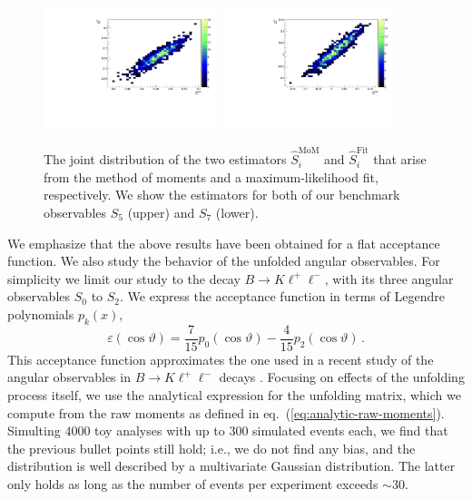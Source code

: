\documentclass[aps,nofootinbib,preprintnumbers,prd,twocolumn]{revtex4-1}
\newcommand{\est}[1]{\widehat{#1}}
\newcommand{\refeq}[1]{eq.~(\ref{eq:#1})}
\renewcommand{\theta}{\vartheta}
\let\eps\varepsilon
\begin{document}
\begin{figure}[t]
        \centering
            \includegraphics[width=0.45\textwidth]{figs/S5_scat.pdf}
            \includegraphics[width=0.45\textwidth]{figs/S7_scat.pdf}
            \caption{The joint distribution of the two estimators
                $\est{S}_i^\text{MoM}$ and $\est{S}_i^\text{Fit}$ that arise
                from the method of moments and a maximum-likelihood fit,
                respectively. We show the estimators for both of our benchmark
                observables $S_5$ (upper) and $S_7$ (lower).
            }
        \label{fig:correlation}
\end{figure}

We emphasize that the above results have been obtained for a flat acceptance
function.  We also study the behavior of the unfolded angular observables.
For simplicity we limit our study to the decay $B\to K\ell^+\ell^-$, with its
three angular observables $S_0$ to $S_2$. We express the acceptance function
in terms of Legendre polynomials $p_k(x)$,
\begin{equation}
    \eps(\cos\theta) = \frac{7}{15} p_0(\cos\theta) - \frac{4}{15} p_2(\cos\theta)\,.
\end{equation}
This acceptance function approximates the one used in a recent study of the
angular observables in $B\to K\ell^+\ell^-$ decays \cite{Aaij:2014tfa}.
Focusing on effects of the unfolding process itself, we use the analytical
expression for the unfolding matrix, which we compute from the raw moments as
defined in \refeq{analytic-raw-moments}. Simulting $4000$ toy analyses with
up to $300$ simulated events each, we find that the previous bullet points
still hold; i.e., we do not find any bias, and the distribution is well
described by a multivariate Gaussian distribution. The latter only holds as
long as the number of events per experiment exceeds $\sim 30$.\\
\end{document}
